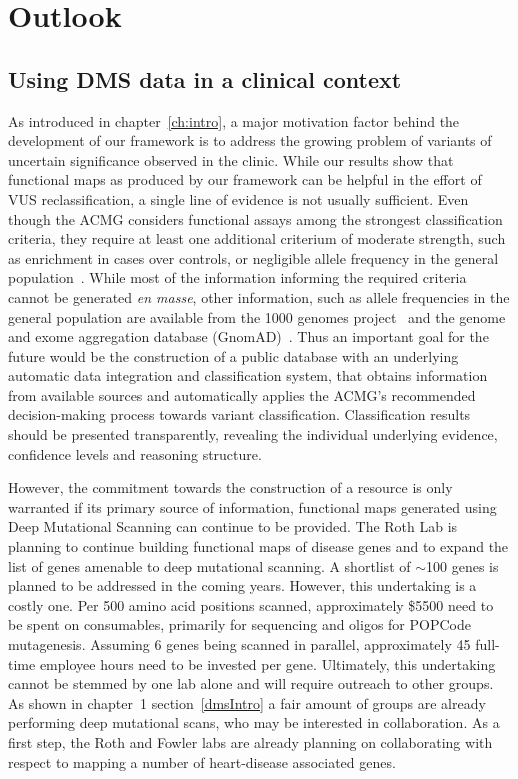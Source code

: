 \section{Outlook}

\subsection{Using DMS data in a clinical context}
As introduced in chapter~\ref{ch:intro}, a major motivation factor behind the development of our framework is to address the growing problem of variants of uncertain significance observed in the clinic. While our results show that functional maps as produced by our framework can be helpful in the effort of VUS reclassification, a single line of evidence is not usually sufficient. Even though the ACMG considers functional assays among the strongest classification criteria, they require at least one additional criterium of moderate strength, such as enrichment in cases over controls, or negligible allele frequency in the general population~\cite{richards_standards_2015}. While most of the information informing the required criteria cannot be generated \textit{en masse}, other information, such as allele frequencies in the general population are available from the 1000 genomes project~\cite{the_1000_genomes_project_consortium_global_2015} and the genome and exome aggregation database (GnomAD)~\cite{lek_analysis_2016}. Thus an important goal for the future would be the construction of a public database with an underlying automatic data integration and classification system, that obtains information from available sources and automatically applies the ACMG's recommended decision-making process towards variant classification. Classification results should be presented transparently, revealing the individual underlying evidence, confidence levels and reasoning structure. 

However, the commitment towards the construction of a resource is only warranted if its primary source of information, functional maps generated using Deep Mutational Scanning can continue to be provided. The Roth Lab is planning to continue building functional maps of disease genes and to expand the list of genes amenable to deep mutational scanning. A shortlist of $\sim$100 genes is planned to be addressed in the coming years. However, this undertaking is a costly one. Per 500 amino acid positions scanned, approximately \$5500 need to be spent on consumables, primarily for sequencing and oligos for POPCode mutagenesis. Assuming 6 genes being scanned in parallel, approximately 45 full-time employee hours need to be invested per gene. Ultimately, this undertaking cannot be stemmed by one lab alone and will require outreach to other groups. As shown in chapter~1 section~\ref{dmsIntro} a fair amount of groups are already performing deep mutational scans, who may be interested in collaboration. As a first step, the Roth and Fowler labs are already planning on collaborating with respect to mapping a number of heart-disease associated genes.


